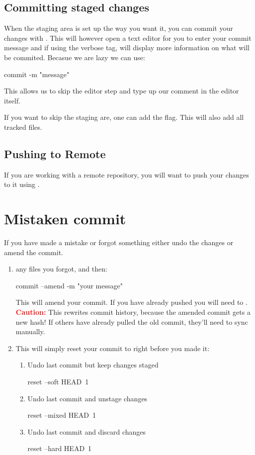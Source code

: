 \subsection{Committing staged changes}
When the staging area is set up the way you want it, you can commit your changes with . This will however open a text editor for you to enter your commit message and if using the  verbose tag, will display more information on what will be commited.\newline
Becasue we are lazy we can use:
\begin{gitBashBox}
commit -m "message"
\end{gitBashBox}
This allows us to skip the editor step and type up our comment in the editor itself.\newline

If you want to skip the staging are, one can add the  flag. This will  also add all tracked files.

\subsection{Pushing to Remote}
If you are working with a remote repository, you will want to push your changes to it using .

\section{Mistaken commit}
If you have made a mistake or forgot something either undo the changes or amend the commit.
\begin{enumerate}
    \item {} any files you forgot, and then:
    \begin{gitBashBox}
    commit --amend -m "your message"
    \end{gitBashBox}
    This will amend your commit. If you have already pushed you will need to . \textcolor{red}{\bfseries Caution:} This rewrites commit history, because the amended commit gets a new hash! If others have already pulled the old commit, they’ll need to sync manually.
\item This will simply reset your commit to right before you made it:\footnotemark[4]
    \begin{enumerate}
    \item Undo last commit but keep changes staged
    \begin{gitBashBox}
reset --soft HEAD~1
    \end{gitBashBox}
    \item Undo last commit and unstage changes
    \begin{gitBashBox}
reset --mixed HEAD~1
    \end{gitBashBox}
    \item Undo last commit and discard changes
    \begin{gitBashBox}
reset --hard HEAD~1
    \end{gitBashBox}
\end{enumerate}
\end{enumerate}



